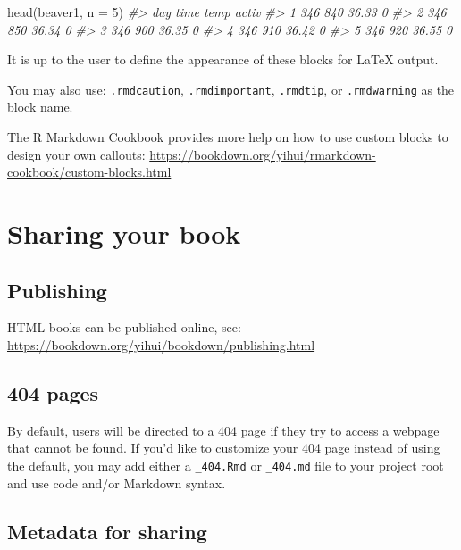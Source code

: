 \documentclass[
]{book}
\newenvironment{Shaded}{\begin{snugshade}}{\end{snugshade}}
\newcommand{\AttributeTok}[1]{\textcolor[rgb]{0.77,0.63,0.00}{#1}}
\newcommand{\CommentTok}[1]{\textcolor[rgb]{0.56,0.35,0.01}{\textit{#1}}}
\newcommand{\DecValTok}[1]{\textcolor[rgb]{0.00,0.00,0.81}{#1}}
\newcommand{\FunctionTok}[1]{\textcolor[rgb]{0.00,0.00,0.00}{#1}}
\newcommand{\NormalTok}[1]{#1}
\theoremstyle{definition}
\theoremstyle{definition}
\theoremstyle{definition}
\theoremstyle{definition}
\theoremstyle{remark}
\begin{document}
\begin{Shaded}
\begin{Highlighting}[]
\FunctionTok{head}\NormalTok{(beaver1, }\AttributeTok{n =} \DecValTok{5}\NormalTok{)}
\CommentTok{\#\textgreater{}   day time  temp activ}
\CommentTok{\#\textgreater{} 1 346  840 36.33     0}
\CommentTok{\#\textgreater{} 2 346  850 36.34     0}
\CommentTok{\#\textgreater{} 3 346  900 36.35     0}
\CommentTok{\#\textgreater{} 4 346  910 36.42     0}
\CommentTok{\#\textgreater{} 5 346  920 36.55     0}
\end{Highlighting}
\end{Shaded}

It is up to the user to define the appearance of these blocks for LaTeX output.

You may also use: \texttt{.rmdcaution}, \texttt{.rmdimportant}, \texttt{.rmdtip}, or \texttt{.rmdwarning} as the block name.

The R Markdown Cookbook provides more help on how to use custom blocks to design your own callouts: \url{https://bookdown.org/yihui/rmarkdown-cookbook/custom-blocks.html}

\hypertarget{sharing-your-book}{%
\chapter{Sharing your book}\label{sharing-your-book}}

\hypertarget{publishing}{%
\section{Publishing}\label{publishing}}

HTML books can be published online, see: \url{https://bookdown.org/yihui/bookdown/publishing.html}

\hypertarget{pages}{%
\section{404 pages}\label{pages}}

By default, users will be directed to a 404 page if they try to access a webpage that cannot be found. If you'd like to customize your 404 page instead of using the default, you may add either a \texttt{\_404.Rmd} or \texttt{\_404.md} file to your project root and use code and/or Markdown syntax.

\hypertarget{metadata-for-sharing}{%
\section{Metadata for sharing}\label{metadata-for-sharing}}
\end{document}
